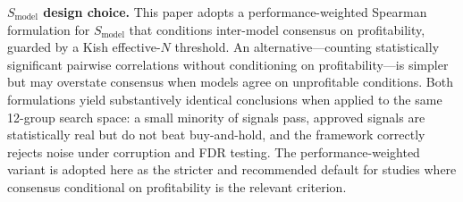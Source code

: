 \documentclass[12pt,a4paper]{article}
\begin{document}
\textbf{$S_{\text{model}}$ design choice.} This paper adopts a performance-weighted Spearman formulation for $S_{\text{model}}$ that conditions inter-model consensus on profitability, guarded by a Kish effective-$N$ threshold. An alternative---counting statistically significant pairwise correlations without conditioning on profitability---is simpler but may overstate consensus when models agree on unprofitable conditions. Both formulations yield substantively identical conclusions when applied to the same 12-group search space: a small minority of signals pass, approved signals are statistically real but do not beat buy-and-hold, and the framework correctly rejects noise under corruption and FDR testing. The performance-weighted variant is adopted here as the stricter and recommended default for studies where consensus conditional on profitability is the relevant criterion.
\end{document}
